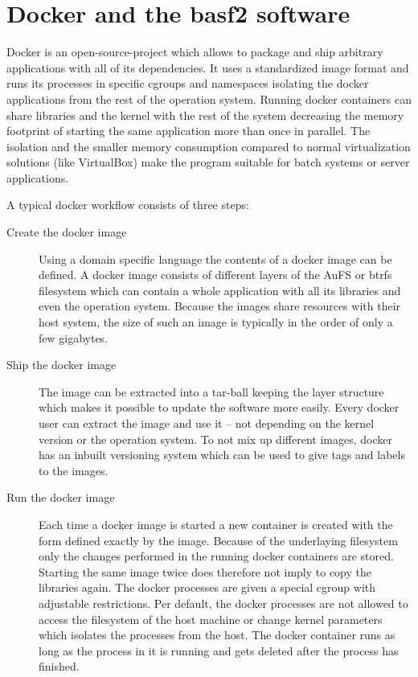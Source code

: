 \section{Docker and the basf2 software}

Docker is an open-source-project \cite{docker} which allows to package and ship arbitrary applications with all of its dependencies. It uses a standardized image format and runs its processes in specific cgroups and namespaces isolating the docker applications from the rest of the operation system. Running docker containers can share libraries and the kernel with the rest of the system decreasing the memory footprint of starting the same application more than once in parallel. The isolation and the smaller memory consumption compared to normal virtualization solutions (like VirtualBox) make the program suitable for batch systems or server applications.

A typical docker workflow consists of three steps:
\begin{description}
  \item[Create the docker image] Using a domain specific language the contents of a docker image can be defined. A docker image consists of different layers of the AuFS or btrfs filesystem which can contain a whole application with all its libraries and even the operation system. Because the images share resources with their host system, the size of such an image is typically in the order of only a few gigabytes.
  \item[Ship the docker image] The image can be extracted into a tar-ball keeping the layer structure which makes it possible to update the software more easily. Every docker user can extract the image and use it -- not depending on the kernel version or the operation system. To not mix up different images, docker has an inbuilt versioning system which can be used to give tags and labels to the images.
  \item[Run the docker image] Each time a docker image is started a new container is created with the form defined exactly by the image. Because of the underlaying filesystem only the changes performed in the running docker containers are stored. Starting the same image twice does therefore not imply to copy the libraries again. The docker processes are given a special cgroup with adjustable restrictions. Per default, the docker processes are not allowed to access the filesystem of the host machine or change kernel parameters which isolates the processes from the host. The docker container runs as long as the process in it is running and gets deleted after the process has finished.
\end{description}

